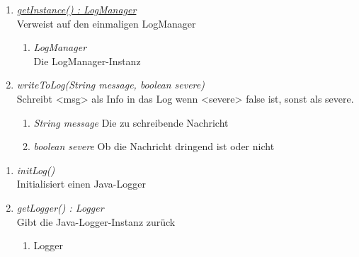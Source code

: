 \begin{enumerate}[+]

	\item \underline{\textit{getInstance() : LogManager}}  \\ Verweist auf den einmaligen LogManager
	
	\vspace{-0.2cm}
	\begin{enumerate}[$\circ$]
		\item \textit{LogManager} \\ Die LogManager-Instanz
	\end{enumerate}

\item \textit{writeToLog(String message, boolean severe)} \\ Schreibt <msg> als Info in das Log wenn <severe> false ist,
sonst als severe.
\begin{enumerate}[$\bullet$]
\item \textit{String message} Die zu schreibende Nachricht
\item \textit{boolean severe} Ob die Nachricht dringend ist oder nicht
\end{enumerate}
\end{enumerate}


\begin{enumerate}[$-$]

\item \textit{initLog()} \\ Initialisiert einen Java-Logger
\vspace{-0.2cm}

\item \textit{getLogger() : Logger} \\ Gibt die Java-Logger-Instanz zurück
\begin{enumerate}[$\circ$]
	\item Logger
\end{enumerate}
\end{enumerate}
	